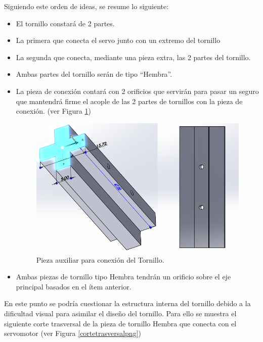 Siguiendo este orden de ideas, se resume lo siguiente:
\begin{itemize}
    \item El tornillo constará de 2 partes.
    \item La primera que conecta el servo junto con un extremo del tornillo
    \item La segunda que conecta, mediante una pieza extra, las 2 partes del tornillo.
    \item Ambas partes del tornillo serán de tipo ``Hembra''.
    \item La pieza de conexión contará con 2 orificios que servirán para pasar un seguro que mantendrá firme el acople de las 2 partes de tornillos con la pieza de conexión. (ver Figura \ref{piezaconexionpng})
    
    \begin{figure}[H]
        \begin{center}
    	\includegraphics[scale=0.4]{img/piezaconexion.png}
        \end{center}
        \caption{Pieza auxiliar para conexión del Tornillo. \label{piezaconexionpng}}
    \end{figure}
    
    \item Ambas piezas de tornillo tipo Hembra tendrán un orificio sobre el eje principal basados en el ítem anterior.
\end{itemize}

En este punto se podría cuestionar la estructura interna del tornillo debido a la dificultad visual para asimilar el diseño del tornillo. Para ello se muestra el siguiente corte trasversal de la pieza de tornillo Hembra que conecta  con el servomotor (ver Figura \ref{cortetrasversalpng})


